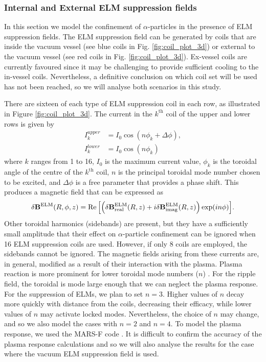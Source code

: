 \documentclass[10pt, a4paper, twoside]{article}
\begin{document}
\newpage
\subsubsection{Internal and External ELM suppression fields}
\label{sec:elm_suppression_field}

In this section we model the confinement of $\alpha$-particles in the presence of ELM suppression fields.
The ELM suppression field can be generated by coils that are inside the vacuum vessel (see blue coils in Fig. \ref{fig:coil_plot_3d}) or external to the vacuum vessel (see red coils in Fig. \ref{fig:coil_plot_3d}). Ex-vessel coils are currently favoured since it may be challenging to provide sufficient cooling to the in-vessel coils. Nevertheless, a definitive conclusion on which coil set will be used has not been reached, so we will analyse both scenarios in this study.

There are sixteen of each type of ELM suppression coil in each row, as illustrated in Figure \ref{fig:coil_plot_3d}. The current in the $k^\text{th}$ coil of the upper and lower rows is given by
\begin{align}
    \label{eq:ELM_coilcurrent_profile_upper}
    I_k^{upper} &= I_0 \cos(n \phi_k + \Delta \phi), \\
    \label{eq:ELM_coilcurrent_profile_lower}
    I_k^{lower} &= I_0 \cos(n \phi_k)
\end{align}
where $k$ ranges from 1 to 16, $I_0$ is the maximum current value, $\phi_k$ is the toroidal angle of the centre of the $k^\text{th}$ coil, $n$ is the principal toroidal mode number chosen to be excited, and $\Delta \phi$ is a free parameter that provides a phase shift. This produces a magnetic field that can be expressed as
\begin{equation}
    \delta\textbf{B}^\text{ELM}(R, \phi, z)=\Re\qty[\qty(\delta\textbf{B}^\text{ELM}_\text{real}(R,z) + i\delta\textbf{B}^\text{ELM}_\text{imag}(R,z))\exp(in\phi)].
\end{equation}
Other toroidal harmonics (sidebands) are present, but they have a sufficiently small amplitude that their effect on $\alpha$-particle confinement can be ignored when 16 ELM suppression coils are used. However, if only 8 coils are employed, the sidebands cannot be ignored. The magnetic fields arising from these currents are, in general, modified as a result of their interaction with the plasma. Plasma reaction is more prominent for lower toroidal mode numbers ($n$) \cite{mcclements2005}. For the ripple field, the toroidal is mode large enough that we can neglect the plasma response. For the suppression of ELMs, we plan to set $n=3$. Higher values of $n$ decay more quickly with distance from the coils, decreasing their efficacy, while lower values of $n$ may activate locked modes. Nevertheless, the choice of $n$ may change, and so we also model the cases with $n=2$ and $n=4$. To model the plasma response, we used the MARS-F code \cite{liu2015}. It is difficult to confirm the accuracy of the plasma response calculations and so we will also analyse the results for the case where the vacuum ELM suppression field is used.
\end{document}
